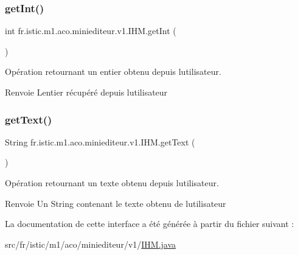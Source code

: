 \subsubsection{\texorpdfstring{get\+Int()}{getInt()}}
{\footnotesize\ttfamily int fr.\+istic.\+m1.\+aco.\+miniediteur.\+v1.\+I\+H\+M.\+get\+Int (\begin{DoxyParamCaption}{ }\end{DoxyParamCaption})}



Opération retournant un entier obtenu depuis l\textquotesingle{}utilisateur. 

\begin{DoxyReturn}{Renvoie}
L\textquotesingle{}entier récupéré depuis l\textquotesingle{}utilisateur 
\end{DoxyReturn}
\mbox{\label{interfacefr_1_1istic_1_1m1_1_1aco_1_1miniediteur_1_1v1_1_1IHM_a3a2eaf2d7c5d0fa8f2de907c54f3e59b}} 
\subsubsection{\texorpdfstring{get\+Text()}{getText()}}
{\footnotesize\ttfamily String fr.\+istic.\+m1.\+aco.\+miniediteur.\+v1.\+I\+H\+M.\+get\+Text (\begin{DoxyParamCaption}{ }\end{DoxyParamCaption})}



Opération retournant un texte obtenu depuis l\textquotesingle{}utilisateur. 

\begin{DoxyReturn}{Renvoie}
Un String contenant le texte obtenu de l\textquotesingle{}utilisateur 
\end{DoxyReturn}


La documentation de cette interface a été générée à partir du fichier suivant \+:\begin{DoxyCompactItemize}
\item 
src/fr/istic/m1/aco/miniediteur/v1/\hyperlink{IHM_8java}{I\+H\+M.\+java}\end{DoxyCompactItemize}
